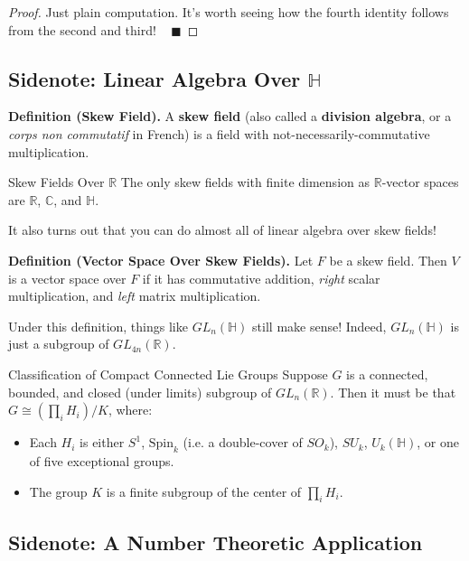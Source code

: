 \begin{proof}
    Just plain computation.  It's worth seeing how the fourth identity follows from the second and third! ~ $\blacksquare$
\end{proof}

\subsection{Sidenote: Linear Algebra Over $\mathbb{H}$}

\textbf{Definition (Skew Field).} A \textbf{skew field} (also called a \textbf{division algebra}, or a \emph{corps non commutatif} in French) is a field with not-necessarily-commutative multiplication.

\begin{theorem}{Skew Fields Over $\mathbb{R}$}
    The only skew fields with finite dimension as $\mathbb{R}$-vector spaces are $\mathbb{R}$, $\mathbb{C}$, and $\mathbb{H}$.
\end{theorem}

It also turns out that you can do almost all of linear algebra over skew fields!

\textbf{Definition (Vector Space Over Skew Fields).} Let $F$ be a skew field. Then $V$ is a vector space over $F$ if it has commutative addition, \emph{right} scalar multiplication, and \emph{left} matrix multiplication.

Under this definition, things like $GL_n(\mathbb{H})$ still make sense!  Indeed, $GL_n(\mathbb{H})$ is just a subgroup of $GL_{4n}(\mathbb{R})$.

\begin{theorem}{Classification of Compact Connected Lie Groups}
    Suppose $G$ is a connected, bounded, and closed (under limits) subgroup of $GL_n(\mathbb{R})$.  Then it must be that $G \cong (\prod_i H_i) / K$, where:
    \begin{itemize}
        \item Each $H_i$ is either $S^1$, $\mathrm{Spin}_k$ (i.e. a double-cover of $SO_k$), $SU_k$, $U_k(\mathbb{H})$, or one of five exceptional groups.
        \item The group $K$ is a finite subgroup of the center of $\prod_i H_i$.
    \end{itemize}
\end{theorem}

\subsection{Sidenote: A Number Theoretic Application}


